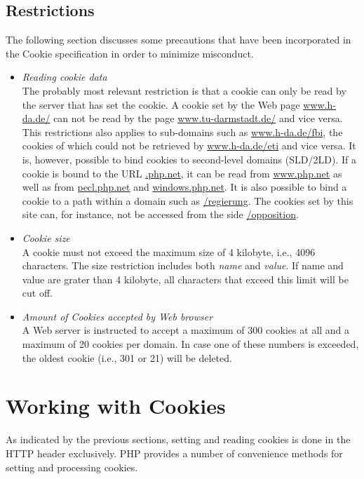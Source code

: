 \documentclass[a4paper, justified, notoc]{tufte-handout} %
\begin{document}
\subsection{Restrictions} %
\label{sub:limitations}
The following section discusses some precautions that have been incorporated in the Cookie specification in order to minimize misconduct.

\begin{itemize}
	\item \emph{Reading cookie data} \\ The probably most relevant restriction is that a cookie can only be read by the server that has set the cookie. 
A cookie set by the Web page \url{www.h-da.de/} can not be read by the page \url{www.tu-darmstadt.de/} and vice versa. This restrictions also applies to sub-domains such as \url{www.h-da.de/fbi}, the cookies of which could not be retrieved by \url{www.h-da.de/eti} and vice versa. 
It is, however, possible to bind cookies to second-level domains (SLD/2LD).
If a cookie is bound to the URL \url{.php.net}, it can be read from \url{www.php.net} as well as from \url{pecl.php.net} and \url{windows.php.net}.
It is also possible to bind a cookie to a path within a domain such as \url{/regierung}. The cookies set by this site can, for instance, not be accessed from the side \url{/opposition}.

\item \emph{Cookie size} \\ A cookie must not exceed the maximum size of 4 kilobyte, i.e., 4096 characters. The size restriction includes both \emph{name} and \emph{value}. If name and value are grater than 4 kilobyte, all characters that exceed this limit will be cut off. 

\item \emph{Amount of Cookies accepted by Web browser} \\ A Web server is instructed to accept a maximum of 300 cookies at all and a maximum of 20 cookies per domain. In case one of these numbers is exceeded, the oldest cookie (i.e., 301 or 21) will be deleted.    
\end{itemize}



\section{Working with Cookies } %
\label{sec:working_with_cookies}
As indicated by the previous sections, setting and reading cookies is done in the HTTP header exclusively. 
PHP provides a number of convenience methods for setting and processing cookies.
\end{document}
